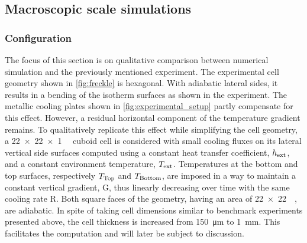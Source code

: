 \subsection{Macroscopic scale simulations}
%
\subsubsection{Configuration}
The focus of this section is on qualitative comparison between numerical simulation and the previously mentioned experiment. 
The experimental cell geometry shown in \cref{fig:freckle} is hexagonal. With adiabatic lateral sides, it results in a 
bending of the isotherm surfaces as shown in the experiment. The metallic cooling plates shown in \cref{fig:experimental_setup}
partly compensate for this effect. However, a residual horizontal component of the temperature gradient 
remains. To qualitatively replicate this effect while simplifying the cell geometry, a \SI{22 x 22 x 1}{\milli \uvolume}  
cuboid cell is considered with small cooling fluxes on its lateral vertical side surfaces computed using a constant heat transfer 
coefficient, $h_{\text{ext}}$, and a constant environment temperature, $T_{\text{ext}}$. Temperatures at the bottom and top surfaces, 
respectively $T_{\text{Top}}$  and $T_{\text{Bottom}}$, are imposed in a way to maintain a constant vertical gradient, G, thus linearly 
decreasing over time with the same cooling rate R. Both square faces of the geometry, having an area of \SI{22 x 22}{\milli \uarea}, 
are adiabatic. In spite of taking cell dimensions similar to benchmark experiments presented above, the cell thickness 
is increased from \SI{150}{\micro \metre} to \SI{1}{\milli \metre}. This facilitates the computation and will later be subject to discussion. 
%
\begin{table}[htbp]
\centering
\caption{Summary of the simulations and and the corresponding parameters for the FE cases, where a purely macroscopic model is used.
Parameters are varied from (G1) low to (G2) high gradient and (L0) no, to (L1) low lateral cooling.}
\label{table:simulation_InGa_fe}
\end{table}
%

